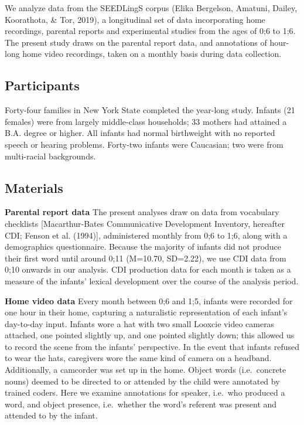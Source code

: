 \documentclass[
  english,
  man,floatsintext]{apa6}
\begin{document}
We analyze data from the SEEDLingS corpus (Elika Bergelson, Amatuni, Dailey, Koorathota, \& Tor, 2019), a longitudinal set of data incorporating home recordings, parental reports and experimental studies from the ages of 0;6 to 1;6. The present study draws on the parental report data, and annotations of hour-long home video recordings, taken on a monthly basis during data collection.

\hypertarget{participants}{%
\subsection{Participants}\label{participants}}

Forty-four families in New York State completed the year-long study. Infants (21 females) were from largely middle-class households; 33 mothers had attained a B.A. degree or higher. All infants had normal birthweight with no reported speech or hearing problems. Forty-two infants were Caucasian; two were from multi-racial backgrounds.

\hypertarget{materials}{%
\subsection{Materials}\label{materials}}

\textbf{Parental report data} The present analyses draw on data from vocabulary checklists {[}Macarthur-Bates Communicative Development Inventory, hereafter CDI; Fenson et al. (1994){]}, administered monthly from 0;6 to 1;6, along with a demographics questionnaire. Because the majority of infants did not produce their first word until around 0;11 (M=10.70, SD=2.22), we use CDI data from 0;10 onwards in our analysis. CDI production data for each month is taken as a measure of the infants' lexical development over the course of the analysis period.

\textbf{Home video data} Every month between 0;6 and 1;5, infants were recorded for one hour in their home, capturing a naturalistic representation of each infant's day-to-day input. Infants wore a hat with two small Looxcie video cameras attached, one pointed slightly up, and one pointed slightly down; this allowed us to record the scene from the infants' perspective. In the event that infants refused to wear the hats, caregivers wore the same kind of camera on a headband. Additionally, a camcorder was set up in the home. Object words (i.e.~concrete nouns) deemed to be directed to or attended by the child were annotated by trained coders. Here we examine annotations for speaker, i.e.~who produced a word, and object presence, i.e.~whether the word's referent was present and attended to by the infant.
\end{document}
